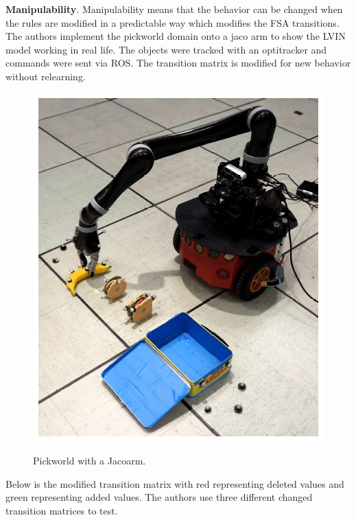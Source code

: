\documentclass[letterpaper, 10 pt, conference]{ieeeconf}  %
\begin{document}
\textbf{Manipulability}. Manipulability means that the behavior can be changed when the rules are modified in a predictable way which modifies the FSA transitions. The authors implement the pickworld domain onto a jaco arm to show the LVIN model working in real life. The objects were tracked with an optitracker and commands were sent via ROS. The transition matrix is modified for new behavior without relearning. 
\begin{figure}[h]
 \centering
 \includegraphics[scale=.3]{JacoArm.JPG}\\
 \caption{Pickworld with a Jacoarm.}
\end{figure}
\newpage
Below is the modified transition matrix with red representing deleted values and green representing added values. The authors use three different changed transition matrices to test.
\end{document}
